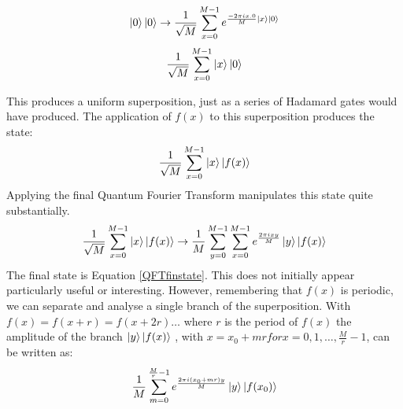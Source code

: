 \documentclass[authoryearcitations]{UoYCSproject}
\begin{document}
\begin{equation*}
 \left\vert{0}\right\rangle\left\vert{0}\right\rangle \rightarrow \frac{1}{\sqrt{M}}\sum_{x=0}^{M-1}e^{\frac{-2\pi{i}x.0}{M}\left\vert{x}\right\rangle\left\vert{0}\right\rangle}
\end{equation*}
\begin{equation*}
 \frac{1}{\sqrt{M}}\sum_{x=0}^{M-1}\left\vert{x}\right\rangle\left\vert{0}\right\rangle
\end{equation*}

This produces a uniform superposition, just as a series of Hadamard gates would have produced.
The application of $f(x)$ to this superposition produces the state:
\begin{equation*}
 \frac{1}{\sqrt{M}}\sum_{x=0}^{M-1}\left\vert{x}\right\rangle\left\vert{f(x)}\right\rangle
\end{equation*}
Applying the final Quantum Fourier Transform manipulates this state quite substantially.
\begin{equation}
 \frac{1}{\sqrt{M}}\sum_{x=0}^{M-1}\left\vert{x}\right\rangle\left\vert{f(x)}\right\rangle \rightarrow \frac{1}{M}\sum_{y=0}^{M-1}\sum_{x=0}^{M-1}e^{\frac{2\pi{i}xy}{M}}\left\vert{y}\right\rangle\left\vert{f(x)}\right\rangle
\label{QFTfinstate}
\end{equation}
The final state is Equation \ref{QFTfinstate}.
This does not initially appear particularly useful or interesting.
However, remembering that $f(x)$ is periodic, we can separate and analyse a single branch of the superposition.
With $f(x)=f(x+r)=f(x+2r)\dots$ where $r$ is the period of $f(x)$ the amplitude of the branch $\left\vert{y}\right\rangle\left\vert{f(x)}\right\rangle$ , with $x=x_0+mr for x=0,1,\dots,\frac{M}{r}-1$, can be written as:
\begin{equation*}
 \frac{1}{M}\sum_{m=0}^{\frac{M}{r}-1}e^{\frac{2\pi{i}(x_0+mr)y}{M}}\left\vert{y}\right\rangle\left\vert{f(x_0)}\right\rangle
\end{equation*}
\end{document}
